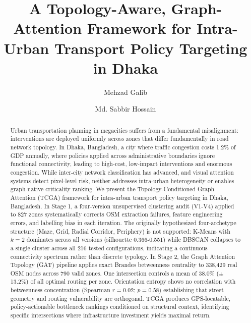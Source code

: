 \documentclass[sigconf, nonacm]{acmart}
\begin{document}
\title{A Topology-Aware, Graph-Attention Framework for Intra-Urban Transport Policy Targeting in Dhaka}

\author{Mehzad Galib}

\author{Md. Sabbir Hossain}

\begin{abstract}
Urban transportation planning in megacities suffers from a fundamental misalignment: interventions are deployed uniformly across zones that differ fundamentally in road network topology. In Dhaka, Bangladesh, a city where traffic congestion costs 1.2\% of GDP annually, where policies applied across administrative boundaries ignore functional connectivity, leading to high-cost, low-impact interventions and enormous congestion. While inter-city network classification has advanced, and visual attention systems detect pixel-level risk, neither addresses intra-urban heterogeneity or enables graph-native criticality ranking. We present the Topology-Conditioned Graph Attention (TCGA) framework for intra-urban transport policy targeting in Dhaka, Bangladesh. In Stage 1, a four-version unsupervised clustering audit (V1-V4) applied to 827 zones systematically corrects OSM extraction failures, feature engineering errors, and labelling bias in each iteration. The originally hypothesized four-archetype structure (Maze, Grid, Radial Corridor, Periphery) is not supported: K-Means with $k=2$ dominates across all versions (silhouette 0.366-0.551) while DBSCAN collapses to a single cluster across all 216 tested configurations, indicating a continuous connectivity spectrum rather than discrete typology. In Stage 2, the Graph Attention Topology (GAT) pipeline applies exact Brandes betweenness centrality to 338,429 real OSM nodes across 790 valid zones. One intersection controls a mean of 38.0\% ($\pm$ 13.2\%) of all optimal routing per zone. Orientation entropy shows no correlation with betweenness concentration (Spearman $r=0.02$; $p=0.58)$ establishing that street geometry and routing vulnerability are orthogonal. TCGA produces GPS-locatable, policy-actionable bottleneck rankings conditioned on structural context, identifying specific intersections where infrastructure investment yields maximal return.
\end{abstract}
\end{document}
